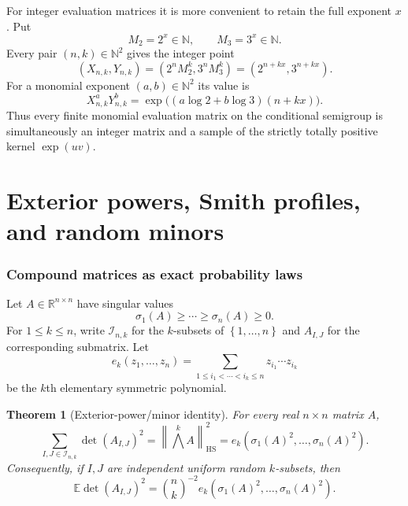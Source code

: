 \documentclass[11pt,oneside]{article}
\newtheorem{theorem}{Theorem}[section]
\theoremstyle{definition}
\theoremstyle{remark}
\newcommand{\Mtwo}{M_2}
\newcommand{\Mthree}{M_3}
\newcommand{\R}{\mathbb{R}}
\newcommand{\N}{\mathbb{N}}
\newcommand{\E}{\mathbb{E}}
\newcommand{\norm}[1]{\left\lVert #1\right\rVert}
\newcommand{\set}[1]{\left\{#1\right\}}
\begin{document}
For integer evaluation matrices it is more convenient to retain the full exponent $x$.  Put
\[
 \Mtwo=2^x\in\N,\qquad \Mthree=3^x\in\N.
\]
Every pair $(n,k)\in\N^2$ gives the integer point
\begin{equation}
 (X_{n,k},Y_{n,k})=(2^n\Mtwo^k,3^n\Mthree^k)
  =(2^{n+kx},3^{n+kx}).
 \label{eq:semigroup-points}
\end{equation}
For a monomial exponent $(a,b)\in\N^2$ its value is
\begin{equation}
 X_{n,k}^aY_{n,k}^b
 =\exp\bigl((a\log2+b\log3)(n+kx)\bigr).
 \label{eq:exp-kernel-factor}
\end{equation}
Thus every finite monomial evaluation matrix on the conditional semigroup is simultaneously an integer matrix and a sample of the strictly totally positive kernel $\exp(uv)$.

\part{Exterior powers, Smith profiles, and random minors}

\section{Compound matrices as exact probability laws}
\label{sec:compound}

Let $A\in\R^{n\times n}$ have singular values
\[
 \sigma_1(A)\ge\cdots\ge\sigma_n(A)\ge0.
\]
For $1\le k\le n$, write $\mathcal I_{n,k}$ for the $k$-subsets of $\set{1,\dots,n}$ and $A_{I,J}$ for the corresponding submatrix.  Let
\[
 e_k(z_1,\dots,z_n)=\sum_{1\le i_1<\cdots<i_k\le n}z_{i_1}\cdots z_{i_k}
\]
be the $k$th elementary symmetric polynomial.

\begin{theorem}[Exterior-power/minor identity]
\label{thm:minor-identity}
For every real $n\times n$ matrix $A$,
\begin{equation}
 \sum_{I,J\in\mathcal I_{n,k}}\det(A_{I,J})^2
 =\norm{\bigwedge^k A}_{\mathrm{HS}}^2
 =e_k(\sigma_1(A)^2,\dots,\sigma_n(A)^2).
 \label{eq:minor-identity}
\end{equation}
Consequently, if $I,J$ are independent uniform random $k$-subsets, then
\begin{equation}
 \E\det(A_{I,J})^2
 =\binom nk^{-2}e_k(\sigma_1(A)^2,\dots,\sigma_n(A)^2).
 \label{eq:random-minor-expectation}
\end{equation}
\end{theorem}
\end{document}
